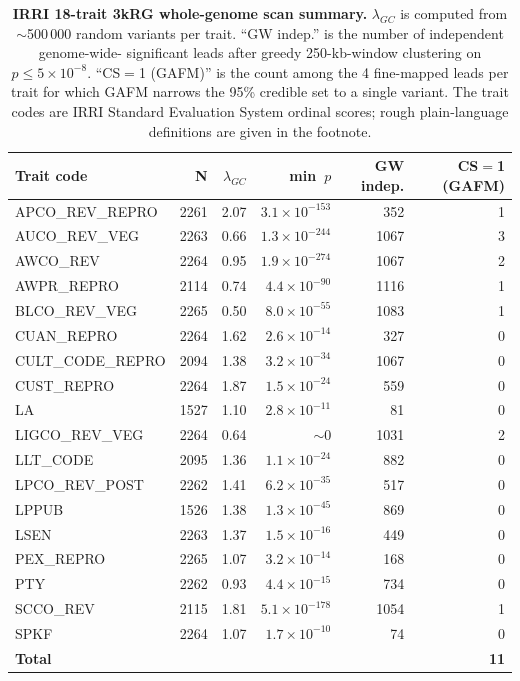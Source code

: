 \begin{table}[htbp]
\centering
\small
\caption{\textbf{IRRI 18-trait 3kRG whole-genome scan summary.}
$\lambda_{GC}$ is computed from $\sim$500\,000 random variants per
trait. ``GW indep.'' is the number of independent genome-wide-
significant leads after greedy 250-kb-window clustering on $p\leq
5\times10^{-8}$. ``CS$=$1 (GAFM)'' is the count among the 4
fine-mapped leads per trait for which GAFM narrows the 95\% credible
set to a single variant. The trait codes are IRRI Standard
Evaluation System ordinal scores; rough plain-language definitions
are given in the footnote.}
\label{tab:sup_irri_scan}
\begin{tabular}{lrrrrr}
\toprule
\textbf{Trait code} & \textbf{N} & $\lambda_{GC}$ & \textbf{min}~$p$ & \textbf{GW indep.} & \textbf{CS$=$1 (GAFM)} \\
\midrule
APCO\_REV\_REPRO  & 2261 & 2.07 & $3.1\times10^{-153}$ & 352  & 1 \\
AUCO\_REV\_VEG    & 2263 & 0.66 & $1.3\times10^{-244}$ & 1067 & 3 \\
AWCO\_REV         & 2264 & 0.95 & $1.9\times10^{-274}$ & 1067 & 2 \\
AWPR\_REPRO       & 2114 & 0.74 & $4.4\times10^{-90}$  & 1116 & 1 \\
BLCO\_REV\_VEG    & 2265 & 0.50 & $8.0\times10^{-55}$  & 1083 & 1 \\
CUAN\_REPRO       & 2264 & 1.62 & $2.6\times10^{-14}$  & 327  & 0 \\
CULT\_CODE\_REPRO & 2094 & 1.38 & $3.2\times10^{-34}$  & 1067 & 0 \\
CUST\_REPRO       & 2264 & 1.87 & $1.5\times10^{-24}$  & 559  & 0 \\
LA                & 1527 & 1.10 & $2.8\times10^{-11}$  & 81   & 0 \\
LIGCO\_REV\_VEG   & 2264 & 0.64 & $\sim$0              & 1031 & 2 \\
LLT\_CODE         & 2095 & 1.36 & $1.1\times10^{-24}$  & 882  & 0 \\
LPCO\_REV\_POST   & 2262 & 1.41 & $6.2\times10^{-35}$  & 517  & 0 \\
LPPUB             & 1526 & 1.38 & $1.3\times10^{-45}$  & 869  & 0 \\
LSEN              & 2263 & 1.37 & $1.5\times10^{-16}$  & 449  & 0 \\
PEX\_REPRO        & 2265 & 1.07 & $3.2\times10^{-14}$  & 168  & 0 \\
PTY               & 2262 & 0.93 & $4.4\times10^{-15}$  & 734  & 0 \\
SCCO\_REV         & 2115 & 1.81 & $5.1\times10^{-178}$ & 1054 & 1 \\
SPKF              & 2264 & 1.07 & $1.7\times10^{-10}$  & 74   & 0 \\
\midrule
\textbf{Total}    &      &      &                      &      & \textbf{11} \\
\bottomrule
\end{tabular}
\end{table}

